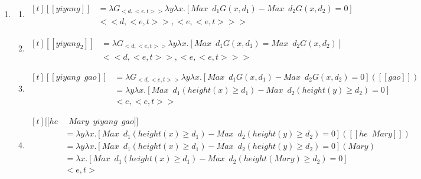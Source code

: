 \documentclass{ctexart}
\begin{document}
\begin{enumerate}
    \item \label{equality_example_3}
    \begin{enumerate}
        \item \label{equality_example_3_a}
        $\begin{aligned}[t]
            [\![yiyang]\!] 
            &= \lambda G_{<d,<e,t>>} \lambda y \lambda x.[Max \enspace d_1 G(x,d_1) -  Max \enspace d_2 G(x,d_2) = 0]\\ &
            <<d,<e,t>>,<e,<e,t>>>
        \end{aligned}$

        \item \label{equality_example_3_a_prime}
        $\begin{aligned}[t]
            [\![yiyang_{2}]\!] 
            &= \lambda G_{<d,<e,t>>} \lambda y \lambda x.[Max \enspace d_1 G(x,d_1) =  Max \enspace d_2 G(x,d_2)]\\ &
            <<d,<e,t>>,<e,<e,t>>>
        \end{aligned}$

        \item \label{equality_example_3_b}
        $\begin{aligned}[t]
            [\![yiyang \enspace gao]\!] 
            &= \lambda G_{<d,<e,t>>} \lambda y \lambda x.[Max \enspace d_1 G(x,d_1) - Max \enspace d_2 G(x,d_2) = 0]([\![gao]\!] ) \\
            &= \lambda y \lambda x.[Max \enspace d_1 (height(x) \geq d_1) - Max \enspace d_2 (height(y) \geq d_2) = 0] \\
            & <e,<e,t>>
        \end{aligned}$

        \item \label{equality_example_3_c}
        $\begin{aligned}[t]
            [\![he &\enspace Mary \enspace yiyang \enspace gao]\!] \\
            &= \lambda y \lambda x.[Max \enspace d_1 (height(x) \geq d_1) - Max \enspace d_2 (height(y) \geq d_2) = 0]([\![he \enspace Mary]\!]) \\
            &= \lambda y \lambda x.[Max \enspace d_1 (height(x) \geq d_1) - Max \enspace d_2 (height(y) \geq d_2) = 0](Mary)  \\
            &= \lambda x.[Max \enspace d_1 (height(x) \geq d_1) - Max \enspace d_2 (height(Mary) \geq d_2) = 0] \\
            & <e,t>
        \end{aligned}$


\end{enumerate}
\end{enumerate}
\end{document}
